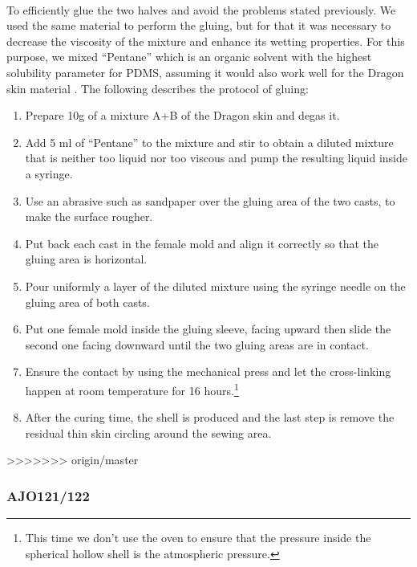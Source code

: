 \paragraph{} 
To efficiently glue the two halves and avoid the problems stated previously. We used the same material to perform the gluing, but for that it was necessary to decrease the viscosity of the mixture and enhance its wetting properties. For this purpose, we mixed "`Pentane"' which is an organic solvent \cite{NgLee2003} with the highest solubility parameter for PDMS, assuming it would also work well for the Dragon skin material .
The following describes the protocol of gluing:
\begin{enumerate}
	\item Prepare 10g of a mixture A+B of the Dragon skin and degas it.
	\item Add 5 ml of "`Pentane"' to the mixture and stir to obtain a diluted mixture that is neither too liquid nor too viscous and pump the resulting liquid inside a syringe.
	\item Use an abrasive such as sandpaper over the gluing area of the two casts, to make the surface rougher.
	\item Put back each cast in the female mold and align it correctly so that the gluing area is horizontal.
	\item Pour uniformly a layer of the diluted mixture using the syringe needle on the gluing area of both casts.
	\item Put one female mold inside the gluing sleeve, facing upward then slide the second one facing downward until the two gluing areas are in contact.
	\item Ensure the contact by using the mechanical press and let the cross-linking happen at room temperature for 16 hours.\footnote{This time we don't use the oven to ensure that the pressure inside the spherical hollow shell is the atmospheric pressure.}
	\item After the curing time, the shell is produced and the last step is remove the residual thin skin circling around the sewing area.
\end{enumerate}
  

>>>>>>> origin/master
\subsubsection{AJO121/122}
